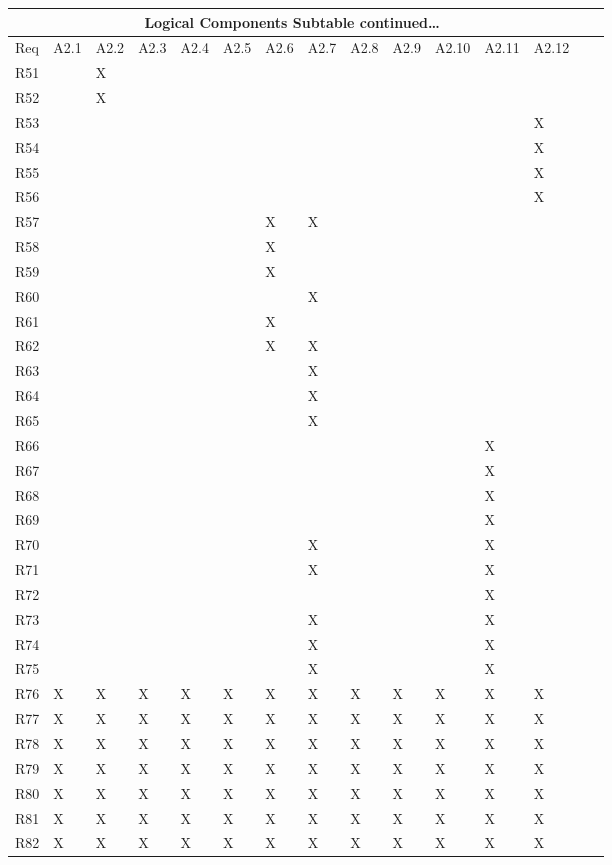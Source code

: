 \documentclass{article}
\begin{document}
\begin{tabular}{|l|l|l|l|l|l|l|l|l|l|l|l|l|l|l|}
\hline
\multicolumn{13}{|c|}{Logical Components Subtable continued\dots}\\\hline
Req& A2.1& A2.2& A2.3& A2.4& A2.5& A2.6& A2.7& A2.8& A2.9& A2.10& A2.11& A2.12\\\hline\hline
R51 &&X&&&&&&&&&& \\\hline
R52 &&X&&&&&&&&&& \\\hline
R53 &&&&&&&&&&&&X \\\hline
R54 &&&&&&&&&&&&X \\\hline
R55 &&&&&&&&&&&&X \\\hline
R56 &&&&&&&&&&&&X \\\hline
R57 &&&&&&X&X&&&&& \\\hline
R58 &&&&&&X&&&&&& \\\hline
R59 &&&&&&X&&&&&& \\\hline
R60 &&&&&&&X&&&&& \\\hline
R61 &&&&&&X&&&&&& \\\hline
R62 &&&&&&X&X&&&&& \\\hline
R63 &&&&&&&X&&&&& \\\hline
R64 &&&&&&&X&&&&& \\\hline
R65 &&&&&&&X&&&&& \\\hline
R66 &&&&&&&&&&&X& \\\hline
R67 &&&&&&&&&&&X& \\\hline
R68 &&&&&&&&&&&X& \\\hline
R69 &&&&&&&&&&&X& \\\hline
R70 &&&&&&&X&&&&X& \\\hline
R71 &&&&&&&X&&&&X& \\\hline
R72 &&&&&&&&&&&X& \\\hline
R73 &&&&&&&X&&&&X& \\\hline
R74 &&&&&&&X&&&&X& \\\hline
R75 &&&&&&&X&&&&X& \\\hline
R76 &X&X&X&X&X&X&X&X&X&X&X&X \\\hline
R77 &X&X&X&X&X&X&X&X&X&X&X&X\\\hline
R78 &X&X&X&X&X&X&X&X&X&X&X&X\\\hline
R79 &X&X&X&X&X&X&X&X&X&X&X&X\\\hline
R80 &X&X&X&X&X&X&X&X&X&X&X&X\\\hline
R81 &X&X&X&X&X&X&X&X&X&X&X&X\\\hline
R82 &X&X&X&X&X&X&X&X&X&X&X&X\\\hline

\end{tabular}
\end{document}
